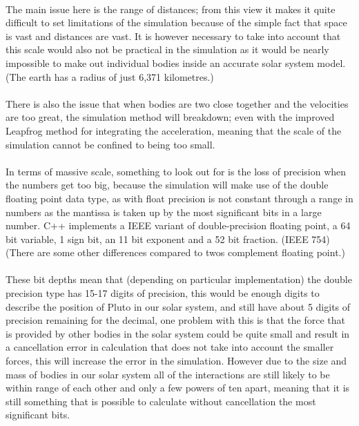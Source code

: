 \paragraph{}
The main issue here is the range of distances; from this view it makes it quite difficult to set limitations of the simulation because of the simple fact that space is vast and distances are vast. It is however necessary to take into account that this scale would also not be practical in the simulation as it would be nearly impossible to make out individual bodies inside an accurate solar system model. (The earth has a radius of just 6,371 kilometres.)

\paragraph{}
There is also the issue that when bodies are two close together and the velocities are too great, the simulation method will breakdown; even with the improved Leapfrog method for integrating the acceleration, meaning that the scale of the simulation cannot be confined to being too small.

\paragraph{}
In terms of massive scale, something to look out for is the loss of precision when the numbers get too big, because the simulation will make use of the double floating point data type, as with float precision is not constant through a range in numbers as the mantissa is taken up by the most significant bits in a large number. C++ implements a IEEE variant of double-precision floating point, a 64 bit variable, 1 sign bit, an 11 bit exponent and a 52 bit fraction. (IEEE 754) (There are some other differences compared to twos complement floating point.)

\paragraph{}
These bit depths mean that (depending on particular implementation) the double precision type has 15-17 digits of precision, this would be enough digits to describe the position of Pluto in our solar system, and still have about 5 digits of precision remaining for the decimal, one problem with this is that the force that is provided by other bodies in the solar system could be quite small and result in a cancellation error in calculation that does not take into account the smaller forces, this will increase the error in the simulation. However due to the size and mass of bodies in our solar system all of the interactions are still likely to be within range of each other and only a few powers of ten apart, meaning that it is still something that is possible to calculate without cancellation the most significant bits.

